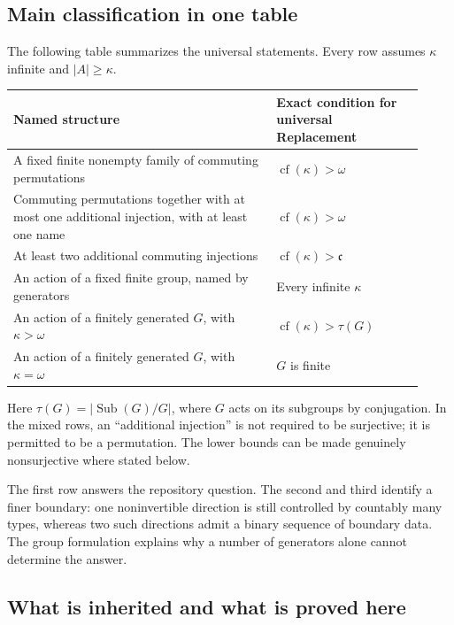\documentclass[11pt,letterpaper]{article}
\numberwithin{equation}{section}
\theoremstyle{plain}
\theoremstyle{definition}
\theoremstyle{remark}
\newcommand{\cf}{\operatorname{cf}}
\newcommand{\cont}{\mathfrak c}
\newcommand{\Sub}{\operatorname{Sub}}
\begin{document}
\subsection{Main classification in one table}

The following table summarizes the universal statements. Every row assumes $\kappa$ infinite and $|A|\geq\kappa$.

\begin{center}
\begin{tabular}{@{}L{0.59\linewidth}L{0.33\linewidth}@{}}
\toprule
Named structure & Exact condition for universal Replacement \\
\midrule
A fixed finite nonempty family of commuting permutations & $\cf(\kappa)>\omega$ \\[4pt]
Commuting permutations together with at most one additional injection, with at least one name & $\cf(\kappa)>\omega$ \\[4pt]
At least two additional commuting injections & $\cf(\kappa)>\cont$ \\[4pt]
An action of a fixed finite group, named by generators & Every infinite $\kappa$ \\[4pt]
An action of a finitely generated $G$, with $\kappa>\omega$ & $\cf(\kappa)>\tau(G)$ \\[4pt]
An action of a finitely generated $G$, with $\kappa=\omega$ & $G$ is finite \\
\bottomrule
\end{tabular}
\end{center}

Here $\tau(G)=|\Sub(G)/G|$, where $G$ acts on its subgroups by conjugation. In the mixed rows, an ``additional injection'' is not required to be surjective; it is permitted to be a permutation. The lower bounds can be made genuinely nonsurjective where stated below.

The first row answers the repository question. The second and third identify a finer boundary: one noninvertible direction is still controlled by countably many types, whereas two such directions admit a binary sequence of boundary data. The group formulation explains why a number of generators alone cannot determine the answer.

\subsection{What is inherited and what is proved here}
\end{document}
